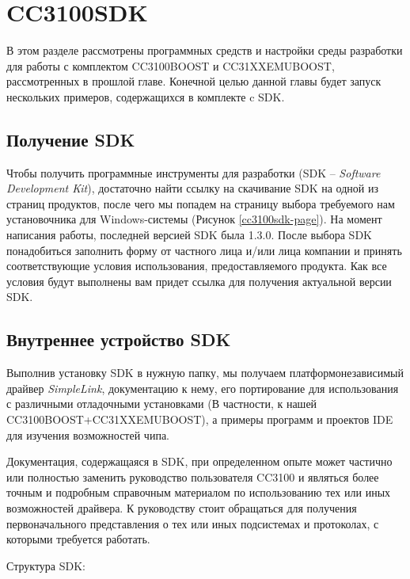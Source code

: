 \chapter{CC3100SDK}
\label{cha:design}

В этом разделе рассмотрены программных средств и настройки
среды разработки для работы с комплектом CC3100BOOST и
CC31XXEMUBOOST, рассмотренных в прошлой главе. Конечной целью
данной главы будет запуск нескольких примеров, содержащихся
в комплекте c SDK.

\section{Получение SDK}

Чтобы получить программные инструменты для разработки
(SDK -- \textit{Software Development Kit}),
достаточно найти ссылку на скачивание SDK на одной из страниц
продуктов, после чего мы попадем на страницу выбора
требуемого нам установочника для Windows-системы \cite{cc3100sdk}
(Рисунок \ref{cc3100sdk-page}). На момент написания работы,
последней версией SDK была 1.3.0. После выбора SDK понадобиться
заполнить форму от частного лица и/или лица компании и принять
соответствующие условия использования, предоставляемого продукта.
Как все условия будут выполнены вам придет ссылка для получения
актуальной версии SDK.


\section{Внутреннее устройство SDK}

Выполнив установку SDK в нужную папку, мы получаем
платформонезависимый драйвер \textit{SimpleLink}, документацию
к нему, его портирование для использования с различными отладочными
установками (В частности, к нашей CC3100BOOST+CC31XXEMUBOOST),
а примеры программ и проектов IDE для изучения возможностей
чипа.

Документация, содержащаяся в SDK, при определенном опыте
может частично или полностью заменить руководство пользователя
CC3100\cite{cc3100userguide} и являться более точным и подробным
справочным материалом по использованию тех или иных возможностей
драйвера. К руководству стоит обращаться для получения первоначального
представления о тех или иных подсистемах и протоколах, с которыми
требуется работать.

Структура SDK:
\vspace{1cm}

